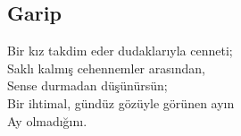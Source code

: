 \subsection{Garip}

Bir kız takdim eder dudaklarıyla cenneti; \\
Saklı kalmış cehennemler arasından, \\
Sense durmadan düşünürsün; \\
Bir ihtimal, gündüz gözüyle görünen ayın \\
Ay olmadığını.